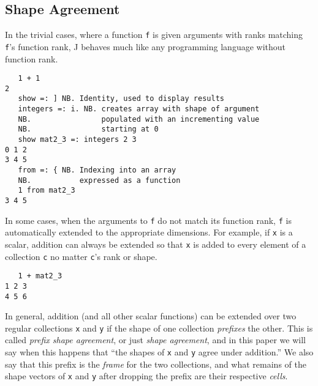 \subsection{Shape Agreement}
In the trivial cases, where a function \texttt{f} is given arguments with ranks matching \texttt{f}'s function rank, 
J behaves much like any programming language without function rank. 
\begin{singlespacing}
\begin{small}
\begin{verbatim}
   1 + 1
2
   show =: ] NB. Identity, used to display results
   integers =: i. NB. creates array with shape of argument
   NB.                populated with an incrementing value
   NB.                starting at 0
   show mat2_3 =: integers 2 3
0 1 2
3 4 5
   from =: { NB. Indexing into an array
   NB.           expressed as a function
   1 from mat2_3
3 4 5
\end{verbatim}
\end{small}
\end{singlespacing}

In some cases, when the arguments to \texttt{f} do not match its function rank, \texttt{f} is automatically extended to the appropriate dimensions.
For example, if \texttt{x} is a scalar, addition can always be extended so that \texttt{x} is added to every element of a collection \texttt{c} 
no matter \texttt{c}'s rank or shape. 

\begin{singlespacing}
\begin{small}
\begin{verbatim}
   1 + mat2_3
1 2 3
4 5 6
\end{verbatim}
\end{small}
\end{singlespacing}

In general, addition (and all other scalar functions) can be extended over two regular collections \texttt{x} and \texttt{y}  
if the shape of one collection \textit{prefixes} the other.
This is called \textit{prefix shape agreement}, or just \textit{shape agreement}\cite{rankanduni}, 
and in this paper we will say when this happens that ``the shapes of \texttt{x} and \texttt{y} agree under addition.''
We also say that this prefix is the \textit{frame} for the two collections,
and what remains of the shape vectors of \texttt{x} and \texttt{y} after dropping the prefix are their respective \textit{cells}.

